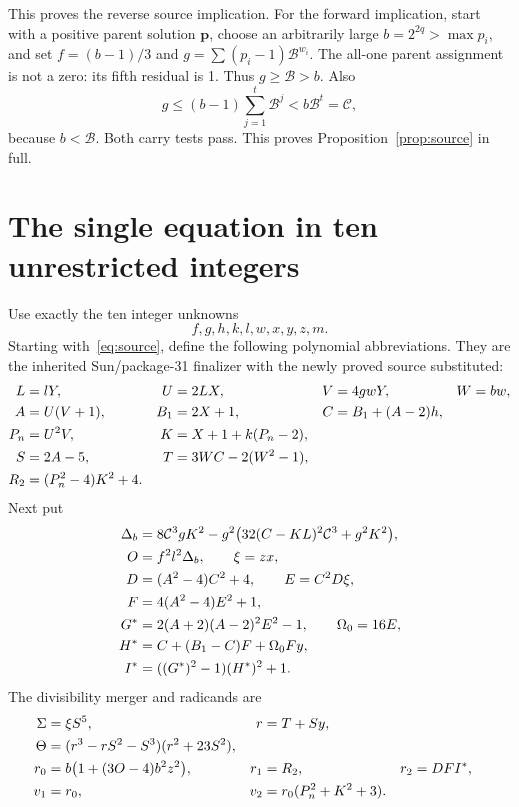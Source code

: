 \documentclass[11pt,letterpaper]{article}
\theoremstyle{definition}\newtheorem{definition}[theorem]{Definition}
\newcommand{\BB}{\mathcal B}\newcommand{\Dc}{\mathcal D}\newcommand{\Ccap}{\mathcal C}
\begin{document}
This proves the reverse source implication. For the forward implication,
start with a positive parent solution $\mathbf p$, choose an arbitrarily
large $b=2^{2q}>\max p_i$, and set $f=(b-1)/3$ and
$g=\sum(p_i-1)\BB^{w_i}$. The all-one parent assignment is not a zero:
its fifth residual is 1. Thus $g\ge\BB>b$. Also
\[
g\le(b-1)\sum_{j=1}^{t}\BB^j<b\BB^t=\Ccap,
\]
because $b<\BB$. Both carry tests pass. This proves
Proposition~\ref{prop:source} in full.

\section{The single equation in ten unrestricted integers}
\label{sec:ten}

Use exactly the ten integer unknowns
\[
f,g,h,k,l,w,x,y,z,m.
\]
Starting with~\eqref{eq:source}, define the following polynomial
abbreviations. They are the inherited Sun/package-31 finalizer
\cite{sun2026,package31,package40} with the newly proved source substituted:
\begin{align}
L&=lY,&U&=2LX,&V&=4gwY,&W&=bw,\notag\\
A&=U(V+1),&B_1&=2X+1,&C&=B_1+(A-2)h,\notag\\
P_n&=U^2V,&K&=X+1+k(P_n-2),\notag\\
S&=2A-5,&T&=3WC-2(W^2-1),\notag\\
R_2&=(P_n^2-4)K^2+4.&&&&\label{eq:tenbridge}
\end{align}
Next put
\begin{align}
\Delta_b&=8\Ccap^3gK^2-g^2\bigl(32(C-KL)^2\Ccap^3+g^2K^2\bigr),\notag\\
O&=f^2l^2\Delta_b,\qquad \xi=zx,\notag\\
D&=(A^2-4)C^2+4,\qquad E=C^2D\xi,\notag\\
F&=4(A^2-4)E^2+1,\notag\\
G^*&=2(A+2)(A-2)^2E^2-1,\qquad\Omega_0=16E,\notag\\
H^*&=C+(B_1-C)F+\Omega_0Fy,\notag\\
I^*&=((G^*)^2-1)(H^*)^2+1.\label{eq:tenlucas}
\end{align}
The divisibility merger and radicands are
\begin{align}
\Sigma&=\xi S^5,&r&=T+Sy,\notag\\
\Theta&=(r^3-rS^2-S^3)(r^2+23S^2),\notag\\
r_0&=b\bigl(1+(3O-4)b^2z^2\bigr),&r_1&=R_2,&r_2&=DFI^*,\notag\\
v_1&=r_0,&v_2&=r_0(P_n^2+K^2+3).
\label{eq:tenrad}
\end{align}
\end{document}
